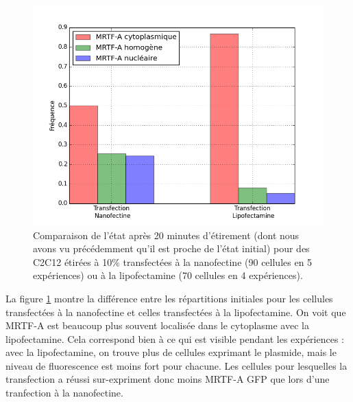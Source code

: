 \begin{figure}
\includegraphics[scale=0.5]{Figures/Lipo_vs_Nano.png}
\caption{Comparaison de l'état après 20 minutes d'étirement (dont nous avons vu précédemment qu'il est proche de l'état initial) pour des C2C12 étirées à 10\% transfectées à la nanofectine (90 cellules en 5 expériences) ou à la lipofectamine (70 cellules en 4 expériences).  \label{LipoNano}}
\end{figure}

La figure \ref{LipoNano} montre la différence entre les répartitions initiales pour les cellules transfectées à la nanofectine et celles transfectées à la lipofectamine. On voit que MRTF-A est beaucoup plus souvent localisée dans le cytoplasme avec la lipofectamine. Cela correspond bien à ce qui est visible pendant les expériences : avec la lipofectamine, on trouve plus de cellules exprimant le plasmide, mais le niveau de fluorescence est moins fort pour chacune. Les cellules pour lesquelles la transfection a réussi sur-expriment donc moins MRTF-A GFP que lors d'une tranfection à la nanofectine.

